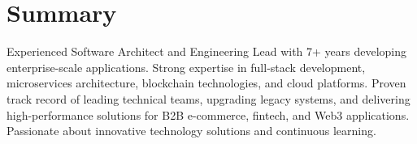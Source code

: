 \documentclass[letterpaper,11pt]{article}
\begin{document}





\section{Summary}
  Experienced Software Architect and Engineering Lead with 7+ years developing enterprise-scale applications. 
  Strong expertise in full-stack development, microservices architecture, blockchain technologies, and cloud platforms. 
  Proven track record of leading technical teams, upgrading legacy systems, and delivering high-performance solutions 
  for B2B e-commerce, fintech, and Web3 applications. Passionate about innovative technology solutions and continuous learning.









\end{document}
